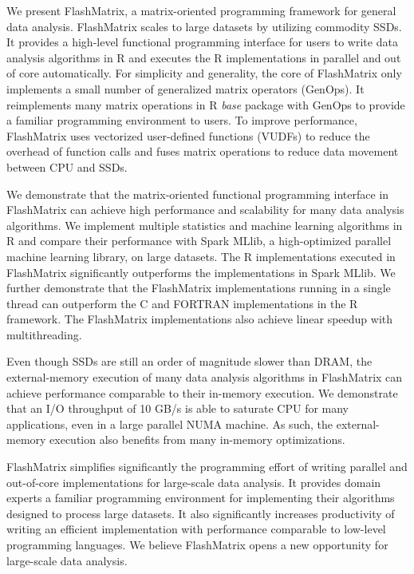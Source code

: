We present FlashMatrix, a matrix-oriented programming framework for general
data analysis. FlashMatrix scales to large datasets by utilizing commodity SSDs.
It provides a high-level functional programming interface for users to write
data analysis algorithms in R and
executes the R implementations in parallel and out of core automatically.
For simplicity and generality, the core of FlashMatrix only implements
a small number of generalized matrix operators (GenOps). It reimplements
many matrix operations in R \textit{base} package with GenOps to provide
a familiar programming environment to users. To improve performance,
FlashMatrix uses vectorized user-defined functions (VUDFs) to reduce the
overhead of function calls and fuses matrix operations to reduce data movement
between CPU and SSDs.

We demonstrate that the matrix-oriented functional programming interface in
FlashMatrix can achieve high performance and scalability for many data analysis
algorithms. We implement multiple statistics and
machine learning algorithms in R and compare their performance with Spark
MLlib, a high-optimized parallel machine learning library, on large datasets.
The R implementations executed in FlashMatrix significantly outperforms
the implementations in Spark MLlib. We further demonstrate that
the FlashMatrix implementations running in a single thread can outperform
the C and FORTRAN implementations in the R framework. The FlashMatrix
implementations also achieve linear speedup with multithreading.

Even though SSDs are still an order of magnitude slower than DRAM, the external-memory
execution of many data analysis algorithms in FlashMatrix can achieve performance
comparable to their in-memory execution. We demonstrate that an I/O throughput
of 10 GB/s is able to saturate CPU for many applications, even in a large parallel
NUMA machine. As such, the external-memory execution also benefits from many in-memory
optimizations.

FlashMatrix simplifies significantly the programming effort of writing
parallel and out-of-core implementations for large-scale data analysis. It
provides domain experts a familiar programming environment for implementing
their algorithms designed to process large datasets. It also significantly
increases productivity of writing an efficient implementation with performance
comparable to low-level programming languages. We believe FlashMatrix opens
a new opportunity for large-scale data analysis.
